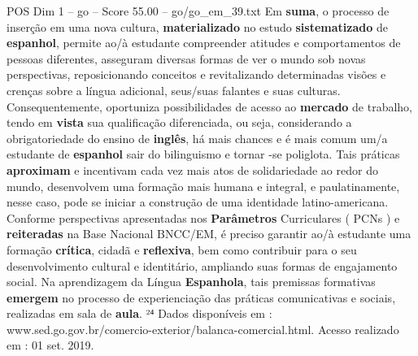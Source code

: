 \begin{textsample}{POS Dim 1 – go – Score 55.00 – go/go\_em\_39.txt}
Em \textbf{suma}, o processo de inserção em uma nova cultura, \textbf{materializado} no estudo \textbf{sistematizado} de \textbf{espanhol}, permite ao/à estudante compreender atitudes e comportamentos de pessoas diferentes, asseguram diversas formas de ver o mundo sob novas perspectivas, reposicionando conceitos e revitalizando determinadas visões e crenças sobre a língua adicional, seus/suas falantes e suas culturas.
Consequentemente, oportuniza possibilidades de acesso ao \textbf{mercado} de trabalho, tendo em \textbf{vista} sua qualificação diferenciada, ou seja, considerando a obrigatoriedade do ensino de \textbf{inglês}, há mais chances e é mais comum um/a estudante de \textbf{espanhol} sair do bilinguismo e tornar -se poliglota.
Tais práticas \textbf{aproximam} e incentivam cada vez mais atos de solidariedade ao redor do mundo, desenvolvem uma formação mais humana e integral, e paulatinamente, nesse caso, pode se iniciar a construção de uma identidade latino-americana.
Conforme perspectivas apresentadas nos \textbf{Parâmetros} Curriculares ( PCNs ) e \textbf{reiteradas} na Base Nacional BNCC/EM, é preciso garantir ao/à estudante uma formação \textbf{crítica}, cidadã e \textbf{reflexiva}, bem como contribuir para o seu desenvolvimento cultural e identitário, ampliando suas formas de engajamento social.
Na aprendizagem da Língua \textbf{Espanhola}, tais premissas formativas \textbf{emergem} no processo de experienciação das práticas comunicativas e sociais, realizadas em sala de \textbf{aula}. ²⁴ Dados disponíveis em : www.sed.go.gov.br/comercio-exterior/balanca-comercial.html.
Acesso realizado em : 01 set. 2019.

\end{textsample}
